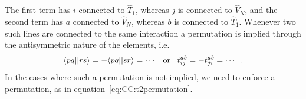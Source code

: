 The first term has $i$ connected to $\hat{T}_1$, whereas $j$ is connected to $\hat{V}_N$, and the second term has $a$ connected to $\hat{V}_N$, whereas $b$ is connected to $\hat{T}_1$.
Whenever two such lines are connected to the same interaction a permutation is implied through the antisymmetric nature of the elements, i.e.
\begin{equation}
\langle pq || rs \rangle = - \langle pq||sr \rangle = \cdots
\hspace{3mm}\textrm{or}\hspace{3mm}
t_{ij}^{ab} = -t_{ji}^{ab} = \cdots\hspace{2mm}.
\end{equation}
In the cases where such a permutation is not implied, we need to enforce a permutation, as in equation~\eqref{eq:CC:t2permutation}.

